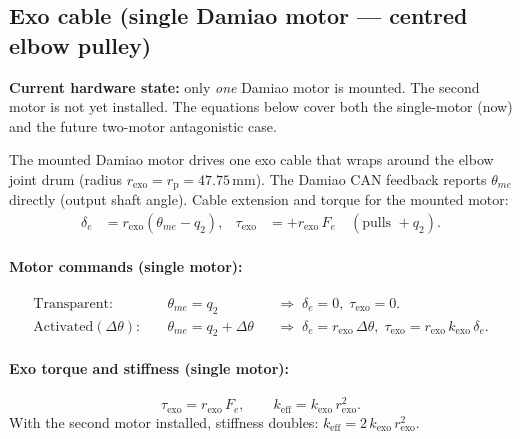 \documentclass[11pt,a4paper]{article}
\newcommand{\rp}{r_{\mathrm{p}}}
\begin{document}
\subsection{Exo cable (single Damiao motor — centred elbow pulley)}
\label{sec:exo_model}

\begin{warnbox}
  \textbf{Current hardware state:} only \emph{one} Damiao motor is mounted.
  The second motor is not yet installed.  The equations below cover
  both the single-motor (now) and the future two-motor antagonistic case.
\end{warnbox}

The mounted Damiao motor drives one exo cable that wraps around the
elbow joint drum (radius $r_{\mathrm{exo}} = \rp = 47.75$\,mm).
The Damiao CAN feedback reports $\theta_{me}$ directly (output shaft angle).
Cable extension and torque for the mounted motor:
\begin{align}
  \delta_e &= r_{\mathrm{exo}}(\theta_{me} - q_2),
  &\tau_{\mathrm{exo}} &= +r_{\mathrm{exo}}\,F_e \quad (\text{pulls }+q_2).
  \label{eq:exo_single}
\end{align}

\paragraph{Motor commands (single motor):}
\begin{align}
  \text{Transparent:} &\quad
  \theta_{me} = q_2
  &&\Rightarrow\; \delta_e = 0,\; \tau_{\mathrm{exo}} = 0.
  \label{eq:transparent}\\
  \text{Activated} (\Delta\theta): &\quad
  \theta_{me} = q_2 + \Delta\theta
  &&\Rightarrow\; \delta_e = r_{\mathrm{exo}}\,\Delta\theta,\;
     \tau_{\mathrm{exo}} = r_{\mathrm{exo}}\,k_{\mathrm{exo}}\,\delta_e.
  \label{eq:cocontract}
\end{align}

\paragraph{Exo torque and stiffness (single motor):}
\begin{equation}
  \tau_{\mathrm{exo}} = r_{\mathrm{exo}}\,F_e,
  \qquad
  \boxed{k_{\mathrm{eff}} = k_{\mathrm{exo}}\,r_{\mathrm{exo}}^2}.
  \label{eq:keff}
\end{equation}
With the second motor installed, stiffness doubles:
$k_{\mathrm{eff}} = 2\,k_{\mathrm{exo}}\,r_{\mathrm{exo}}^2$.
\end{document}
